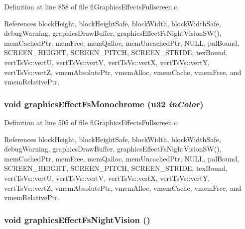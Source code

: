 Definition at line 858 of file fl\-Graphics\-Effects\-Fullscreen.c.

References block\-Height, block\-Height\-Safe, block\-Width, block\-Width\-Safe, debug\-Warning, graphics\-Draw\-Buffer, graphics\-Effect\-Fs\-Night\-Vision\-SW(), mem\-Cached\-Ptr, mem\-Free, mem\-Qalloc, mem\-Uncached\-Ptr, NULL, pal\-Bound, SCREEN\_\-HEIGHT, SCREEN\_\-PITCH, SCREEN\_\-STRIDE, tex\-Bound, vert\-Ts\-Vs::vert\-U, vert\-Ts\-Vs::vert\-V, vert\-Ts\-Vs::vert\-X, vert\-Ts\-Vs::vert\-Y, vert\-Ts\-Vs::vert\-Z, vmem\-Absolute\-Ptr, vmem\-Alloc, vmem\-Cache, vmem\-Free, and vmem\-Relative\-Ptr.
\subsubsection{\setlength{\rightskip}{0pt plus 5cm}void graphics\-Effect\-Fs\-Monochrome (u32 {\em in\-Color})}\label{flGraphicsEffectsFullscreen_8c_7f31d631662d7e8c81e3c669eaaa1384}




Definition at line 505 of file fl\-Graphics\-Effects\-Fullscreen.c.

References block\-Height, block\-Height\-Safe, block\-Width, block\-Width\-Safe, debug\-Warning, graphics\-Draw\-Buffer, graphics\-Effect\-Fs\-Night\-Vision\-SW(), mem\-Cached\-Ptr, mem\-Free, mem\-Qalloc, mem\-Uncached\-Ptr, NULL, pal\-Bound, SCREEN\_\-HEIGHT, SCREEN\_\-PITCH, SCREEN\_\-STRIDE, tex\-Bound, vert\-Ts\-Vs::vert\-U, vert\-Ts\-Vs::vert\-V, vert\-Ts\-Vs::vert\-X, vert\-Ts\-Vs::vert\-Y, vert\-Ts\-Vs::vert\-Z, vmem\-Absolute\-Ptr, vmem\-Alloc, vmem\-Cache, vmem\-Free, and vmem\-Relative\-Ptr.
\subsubsection{\setlength{\rightskip}{0pt plus 5cm}void graphics\-Effect\-Fs\-Night\-Vision ()}\label{flGraphicsEffectsFullscreen_8c_98487e403cf47fa69dcec36d7f272267}




